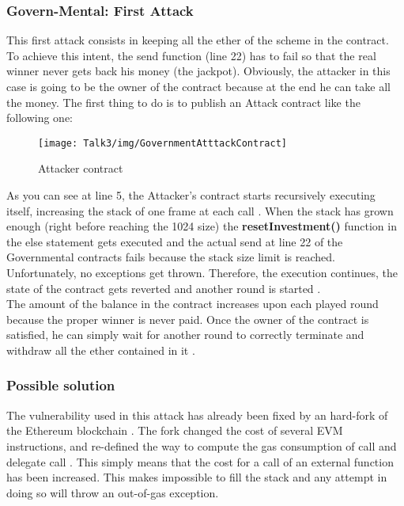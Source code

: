 \subsubsection{Govern-Mental: First Attack}
This first attack consists in keeping all the ether of the scheme in the contract. To achieve this intent, the send function (line 22) has to fail so that the real winner never gets back his money (the jackpot).
Obviously, the attacker in this case is going to be the owner of the contract because at the end he can take all the money.
The first thing to do is to publish an Attack contract like the following one:
\begin{figure}[H]
\begin{center}
\texttt{[image: Talk3/img/GovernmentAtttackContract]}
\end{center}
\caption{Attacker contract}
\label{label}
\end{figure}
As you can see at line 5, the Attacker's contract starts recursively executing itself, increasing the stack of one frame at each call \cite{paper2}.
When the stack has grown enough (right before reaching the 1024 size) the \textbf{resetInvestment()} function in the else statement gets executed and the actual send at line 22 of the Governmental contracts fails because the stack size limit is reached.\\
Unfortunately, no exceptions get thrown. Therefore, the execution continues, the state of the contract gets reverted and another round is started \cite{paper2}.\\
The amount of the balance in the contract increases upon each played round because the proper winner is never paid. Once the owner of the contract is satisfied, he can simply wait for another round to correctly terminate and withdraw all the ether contained in it \cite{paper2}.
\subsubsection{Possible solution}
The vulnerability used in this attack has already been fixed by an hard-fork of the Ethereum blockchain \cite{hardfork}. The fork changed the cost of several EVM instructions, and re-defined the way to compute the gas consumption of call and delegate call \cite{paper2}.
This simply means that the cost for a call of an external function has been increased. This makes impossible to fill the stack and any attempt in doing so will throw an out-of-gas exception. \\
